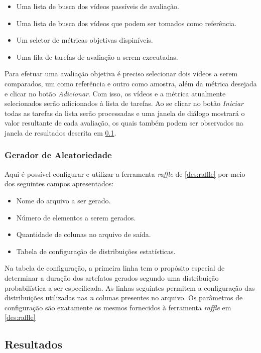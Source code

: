 \begin{itemize}
	\item Uma lista de busca dos vídeos passíveis de avaliação.
	\item Uma lista de busca dos vídeos que podem ser tomados como referência.
	\item Um seletor de métricas objetivas dispiníveis.
	\item Uma fila de tarefas de avaliação a serem executadas.
\end{itemize}

Para efetuar uma avaliação objetiva é preciso selecionar dois vídeos a serem comparados, um como referência e outro como amostra, além da métrica desejada e clicar no botão \emph{Adicionar}.
Com isso, os vídeos e a métrica atualmente selecionados serão adicionados à lista de tarefas. 
Ao se clicar no botão \emph{Iniciar} todas as tarefas da lista serão processadas e uma janela de diálogo mostrará o valor resultante de cada avaliação, os quais também podem ser observados na janela de resultados descrita em \ref{des:resultados}.

\subsubsection{Gerador de Aleatoriedade}

Aqui é possível configurar e utilizar a ferramenta \emph{raffle} de \ref{des:raffle} por meio dos seguintes campos apresentados:

\begin{itemize}
	\item Nome do arquivo a ser gerado.
	\item Número de elementos a serem gerados.
	\item Quantidade de colunas no arquivo de saída.
	\item Tabela de configuração de distribuições estatísticas.
\end{itemize}

Na tabela de configuração, a primeira linha tem o propósito especial de determinar a duração dos artefatos gerados segundo uma distribuição probabilística a ser especificada.
As linhas seguintes permitem a configuração das distribuições utilizadas nas \emph{n} colunas presentes no arquivo.
Os parâmetros de configuração são exatamente os mesmos fornecidos à ferramenta \emph{raffle} em \ref{des:raffle}

\subsection{Resultados}
\label{des:resultados}

